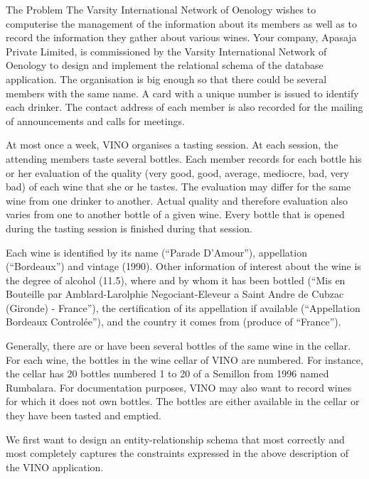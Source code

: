 \documentclass{beamer}
\begin{document}
\begin{frame}{The Problem}
\tiny
The Varsity International Network of Oenology wishes to computerise the management of the information about its members as well as to record the information they gather about various wines. Your company, Apasaja Private Limited, is commissioned by the Varsity International Network of Oenology to design and implement the relational schema of the database application. The organisation is big enough so that there could be several members with the same name. A card with a unique number is issued to identify each drinker. The contact address of each member is also recorded for the mailing of announcements and calls for meetings.

At most once a week, VINO organises a tasting session. At each session, the attending members taste several bottles. Each member records for each bottle his or her evaluation of the quality (very good, good, average, mediocre, bad, very bad) of each wine that she or he tastes. The evaluation may differ for the same wine from one drinker to another. Actual quality and therefore evaluation also varies from one to another bottle of a given wine. Every bottle that is opened during the tasting session is finished during that session.

Each wine is identified by its name (“Parade D'Amour”), appellation (“Bordeaux”) and vintage (1990). Other information of interest about the wine is the degree of alcohol (11.5), where and by whom it has been bottled (“Mis en Bouteille par Amblard-Larolphie Negociant-Eleveur a Saint Andre de Cubzac (Gironde) - France”), the certification of its appellation if available (“Appellation Bordeaux Controlée”), and the country it comes from (produce of “France”).

Generally, there are or have been several bottles of the same wine in the cellar. For each wine, the bottles in the wine cellar of VINO are numbered. For instance, the cellar has 20 bottles numbered 1 to 20 of a Semillon from 1996 named Rumbalara. For documentation purposes, VINO may also want to record wines for which it does not own bottles. The bottles are either available in the cellar or they have been tasted and emptied.

We first want to design an entity-relationship schema that most correctly and most completely captures the constraints expressed in the above description of the VINO application.

\end{frame}
\end{document}
